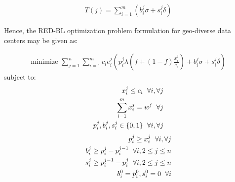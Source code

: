 \begin{align}
T (j) = \sum_{i=1}^{m} \left(b_i^j \sigma + s_i^j \delta\right)
\end{align}

Hence, the RED-BL optimization problem formulation for geo-diverse data centers may be given as:

\begin{align}
\text{minimize } \sum_{j=1}^{n} \sum_{i=1}^{m} c_i e_i^j\left(p_i^j \lambda\left(f+\left(1-f\right)\frac{x_i^j}{c_i}\right) + b_i^j \sigma + s_i^j \delta\right) \label{eq:objective}
\end{align}
subject to:
\begin{align}
x_i^j \le c_i \hspace{6 pt} \forall i, \forall j \label{eq:capcon}\\
\sum_{i = 1}^{m} x_i^j = w^j \hspace{6 pt} \forall j \label{eq:workcon}\\
p_i^j, b_i^j, s_i^j \in \{0,1\} \hspace{6 pt} \forall i, \forall j \label{eq:integer1}
\end{align}
\begin{align}
p_i^j \ge x_i^j \hspace{6 pt} \forall i, \forall j \label{eq:p1}\\
b_i^j \ge p_i^j - p_i^{j-1} \hspace{6 pt} \forall i, 2 \le j \le n \label{eq:bcon}\\
s_i^j \ge p_i^{j-1} - p_i^j \hspace{6 pt} \forall i, 2 \le j \le n \label{eq:scon}\\
b_i^0 = p_i^0, s_i^0 = 0 \hspace{6 pt} \forall i \label{eq:bcon1}
\end{align}

